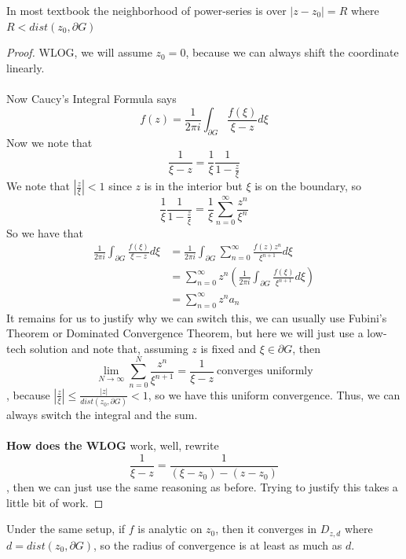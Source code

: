 \documentclass{article}
\begin{document}
\begin{remark}
    In most textbook the neighborhood of power-series is over $|z - z_0| = R$ where $R < dist(z_0, \partial G)$
\end{remark}

\begin{proof}
WLOG, we will assume $z_0 = 0$, because we can always shift the coordinate linearly.\\\\
Now Caucy's Integral Formula says
\[f(z) = \frac{1}{2\pi i} \int_{\partial G} \frac{f(\xi)}{\xi - z} d\xi\]
Now we note that
\[\frac{1}{\xi - z} = \frac{1}{\xi} \frac{1}{1 - \frac{z}{\xi}}\]
We note that $|\frac{z}{\xi}| < 1$ since $z$ is in the interior but $\xi$ is on the boundary, so
\[\frac{1}{\xi} \frac{1}{1 - \frac{z}{\xi}} = \frac{1}{\xi} \sum_{n = 0}^\infty \frac{z^n}{\xi^{n}}\]
So we have that
\begin{align*}
     \frac{1}{2\pi i} \int_{\partial G} \frac{f(\xi)}{\xi - z} d\xi &= \frac{1}{2\pi i} \int_{\partial G} \sum_{n = 0}^\infty \frac{f(z) z^n}{\xi^{n+1}} d\xi\\
     &= \sum_{n = 0}^\infty z^n (\frac{1}{2\pi i} \int_{\partial G} \frac{f(\xi)}{\xi^{n+1}} d\xi) \tag*{ASSUMING We can switch integral and sum}\\
     &= \sum_{n = 0}^\infty z^n a_n
\end{align*}
It remains for us to justify why we can switch this, we can usually use Fubini's Theorem or Dominated Convergence Theorem, but here we will just use a low-tech solution and note that, assuming $z$ is fixed and $\xi \in \partial G$, then
\[\lim_{N \to \infty} \sum_{n = 0}^N \frac{z^n}{\xi^{n+1}} = \frac{1}{\xi - z}\ \text{converges uniformly} \]
, because $|\frac{z}{\xi}| \leq \frac{|z|}{dist(z_0, \partial G)} < 1$, so we have this uniform convergence. Thus, we can always switch the integral and the sum.\\\\
\textbf{How does the WLOG} work, well, rewrite
\[\frac{1}{\xi - z} = \frac{1}{(\xi - z_0) - (z - z_0)}\]
, then we can just use the same reasoning as before. Trying to justify this takes a little bit of work.
\end{proof}

\begin{corollary}
    Under the same setup, if $f$ is analytic on $z_0$, then it converges in $D_{z, d}$ where $d = dist(z_0, \partial G)$, so the radius of convergence is at least as much as $d$.
\end{corollary}
\end{document}
